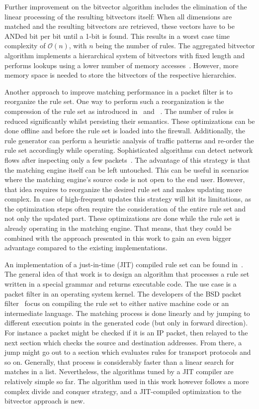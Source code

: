 \documentclass[conference]{IEEEtran}
\begin{document}
Further improvement on the bitvector algorithm includes the elimination of the linear processing of the resulting bitvectors itself:
When all dimensions are matched and the resulting bitvectors are retrieved, 
these vectors have to be ANDed bit per bit until a 1-bit is found.
This results in a worst case time complexity of $\mathcal O(n)$, with $n$ being the number of rules.
The aggregated bitvector algorithm implements a hierarchical system 
of bitvectors with fixed length and performs lookups using a lower number of memory accesses~\cite{abv}.
However, more memory space is needed to store the bitvectors of the respective hierarchies.

Another approach to improve matching performance in a packet filter is to reorganize the rule set.
One way to perform such a reorganization is the compression of the rule set as 
introduced in~\cite{redundancy_removal} and ~\cite{firewall_compressor}.
The number of rules is reduced significantly whilst persisting their semantics.
These optimizations can be done offline and before the rule set is loaded into the firewall.
Additionally, the rule generator can perform a heuristic analysis of  
traffic patterns and re-order the rule set accordingly while operating.
Sophisticated algorithms can detect network flows after inspecting only a few packets~\cite{trafficonthefly}.
The advantage of this strategy is that the matching engine itself can be left untouched.
This can be useful in scenarios where the matching engine's source code is not open to the end user.
However, that idea requires to reorganize the desired rule set and makes updating more complex.
In case of high-frequent updates this strategy will hit its limitations, 
as the optimization steps often require the consideration of the entire rule set and not only the updated part.
These optimizations are done while the rule set is already operating in 
the matching engine.
That means, that they could be combined with the approach presented in this work to
gain an even bigger advantage compared to the existing implementations.

An implementation of a just-in-time (JIT) compiled rule set can be found in~\cite{dpf}.
The general idea of that work is to design an algorithm that processes a rule set
written in a special grammar and returns executable code.
The use case is a packet filter in an operating system kernel.
The developers of the BSD packet filter~\cite{bpf,bpfplus} focus on compiling the rule set to 
either native machine code or an intermediate language.
The matching process is done linearly and by jumping to different execution 
points in the generated code (but only in forward direction).
For instance a packet might be checked if it is an IP packet, then relayed 
to the next section which checks the source and destination addresses.
From there, a jump might go out to a section which evaluates rules for transport protocols and so on.
Generally, that process is considerably faster than a linear search for matches in a list.
Nevertheless, the algorithms tuned by a JIT compiler are relatively simple so far.
The algorithm used in this work however follows a more complex divide and conquer strategy, and a JIT-compiled optimization 
to the bitvector approach is new.
\end{document}

